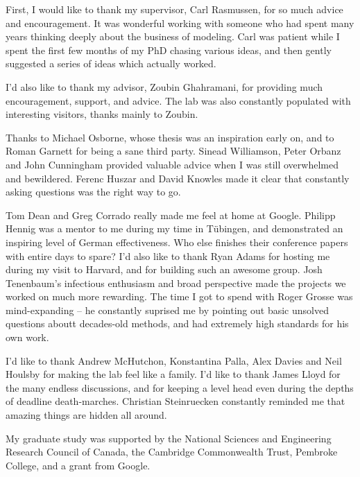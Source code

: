 
\begin{acknowledgements}      


First, I would like to thank my supervisor, Carl Rasmussen, for so much advice and encouragement.
It was wonderful working with someone who had spent many years thinking deeply about the business of modeling.
Carl was patient while I spent the first few months of my PhD chasing various ideas, and then gently suggested a series of ideas which actually worked.

I'd also like to thank my advisor, Zoubin Ghahramani, for providing much encouragement, support, and advice.
The lab was also constantly populated with interesting visitors, thanks mainly to Zoubin.

Thanks to Michael Osborne, whose thesis was an inspiration early on, and to Roman Garnett for being a sane third party.
Sinead Williamson, Peter Orbanz and John Cunningham provided valuable advice when I was still overwhelmed and bewildered.
Ferenc Huszar and David Knowles made it clear that constantly asking questions was the right way to go.

Tom Dean and Greg Corrado really made me feel at home at Google.
Philipp Hennig was a mentor to me during my time in T\"{u}bingen, and demonstrated an inspiring level of German effectiveness.
Who else finishes their conference papers with entire days to spare?
I'd also like to thank Ryan Adams for hosting me during my visit to Harvard, and for building such an awesome group.
Josh Tenenbaum's infectious enthusiasm and broad perspective made the projects we worked on much more rewarding.
The time I got to spend with Roger Grosse was mind-expanding -- he constantly suprised me by pointing out basic unsolved questions aboutt decades-old methods, and had extremely high standards for his own work.

I'd like to thank Andrew McHutchon, Konstantina Palla, Alex Davies and Neil Houlsby for making the lab feel like a family.
I'd like to thank James Lloyd for the many endless discussions, and for keeping a level head even during the depths of deadline death-marches.
Christian Steinruecken constantly reminded me that amazing things are hidden all around.

My graduate study was supported by the National Sciences and Engineering Research Council of Canada, the Cambridge Commonwealth Trust, Pembroke College, and a grant from Google.

\end{acknowledgements}
